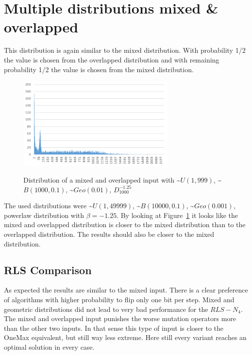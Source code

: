 \section{Multiple distributions mixed \& overlapped}
This distribution is again similar to the mixed distribution.
With probability 1/2 the value is chosen from the overlapped distribution and with remaining probability 1/2 the value is chosen from the mixed distribution.

\begin{figure}[h]
      \caption{Distribution of a mixed and overlapped input with \textasciitilde$U(1,999)$, \textasciitilde$B(1000,0.1)$, \textasciitilde$Geo(0.01)$, $D^{-1.25}_{1000}$}
      \centering
      \includegraphics[width=0.7\textwidth]{figures/images/numberGenerator/mixedAndOverlapped.png}\label{fig:mixAndOverlDistExample}
\end{figure}

The used distributions were \textasciitilde$U(1,49999)$, \textasciitilde$B(10000,0.1)$, \textasciitilde$Geo(0.001)$, powerlaw distribution with $\beta=-1.25$.
By looking at Figure~\ref{fig:mixAndOverlDistExample} it looks like the mixed and overlapped distribution is closer to the mixed distribution than to the overlapped distribution.
The results should also be closer to the mixed distribution.
\subsection{RLS Comparison}




As expected the results are similar to the mixed input.
There is a clear preference of algorithms with higher probability to flip only one bit per step.
Mixed and geometric distributions did not lead to very bad performance for the $RLS-N_4$.
The mixed and overlapped input punishes the worse mutation operators more than the other two inputs.
In that sense this type of input is closer to the OneMax equivalent, but still way less extreme.
Here still every variant reaches an optimal solution in every case.
